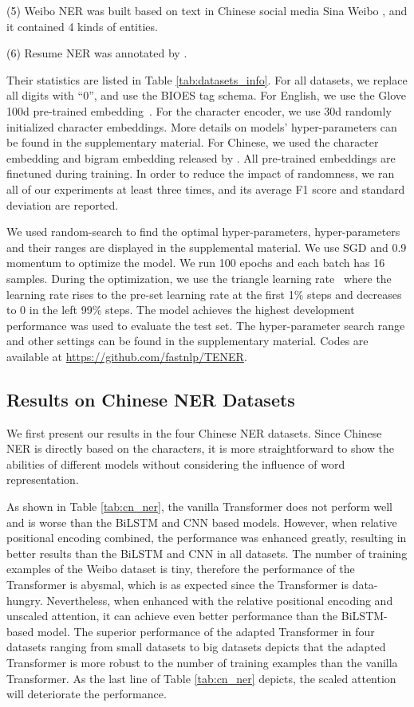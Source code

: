 \documentclass[11pt,a4paper]{article}
\begin{document}
(5) Weibo NER was built based on text in Chinese social media Sina Weibo \cite{DBLP:conf/emnlp/PengD15}, and it contained 4 kinds of entities.

(6) Resume NER was annotated by \cite{DBLP:conf/acl/ZhangY18}.

Their statistics are listed in Table \ref{tab:datasets_info}. For all datasets, we replace all digits with ``0'', and use the BIOES tag schema. For English, we use the Glove 100d pre-trained embedding~\cite{pennington2014glove}. For the character encoder, we use 30d randomly initialized character embeddings. More details on models' hyper-parameters can be found in the supplementary material. For Chinese, we used the character embedding and bigram embedding released by \cite{DBLP:conf/acl/ZhangY18}. All pre-trained embeddings are finetuned during training. In order to reduce the impact of randomness, we ran all of our experiments at least three times, and its average F1 score and standard deviation are reported.

We used random-search to find the optimal hyper-parameters, hyper-parameters and their ranges are displayed in the supplemental material. We use SGD and 0.9 momentum to optimize the model. We run 100 epochs and each batch has 16 samples. During the optimization, we use the triangle learning rate~\cite{DBLP:conf/wacv/Smith17} where the learning rate rises to the pre-set learning rate at the first 1\% steps and decreases to 0 in the left 99\% steps. The model achieves the highest development performance was used to evaluate the test set. The hyper-parameter search range and other settings can be found in the supplementary material. Codes are available at \url{https://github.com/fastnlp/TENER}.

\subsection{Results on Chinese NER Datasets}


We first present our results in the four Chinese NER datasets. Since Chinese NER is directly based on the characters, it is more straightforward to show the abilities of different models without considering the influence of word representation.

As shown in Table \ref{tab:cn_ner}, the vanilla Transformer does not perform well and is worse than the BiLSTM and CNN based models. However, when relative positional encoding combined, the performance was enhanced greatly, resulting in better results than the BiLSTM and CNN in all datasets. The number of training examples of the Weibo dataset is tiny, therefore the performance of the Transformer is abysmal, which is as expected since the Transformer is data-hungry. Nevertheless, when enhanced with the relative positional encoding and unscaled attention, it can achieve even better performance than the BiLSTM-based model. The superior performance of the adapted Transformer in four datasets ranging from small datasets to big datasets depicts that the adapted Transformer is more robust to the number of training examples than the vanilla Transformer. As the last line of Table \ref{tab:cn_ner} depicts, the scaled attention will deteriorate the performance.
\end{document}
